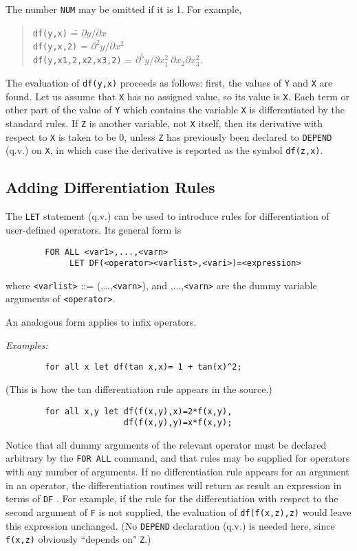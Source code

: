 The number {\tt NUM} may be omitted if it is 1.  For example,
\begin{quote}
\begin{tabbing}
{\tt            df(y,x)} \hspace{1in} \= = $\partial y/\partial x$ \\
{\tt            df(y,x,2)} \> = $\partial^{2}y/\partial x^{2}$ \\
{\tt            df(y,x1,2,x2,x3,2)} \> = $\partial^{5}y/\partial x_{1}^{2} \
 \partial x_{2}\partial x_{3}^{2}.$
\end{tabbing}
\end{quote}
The evaluation of {\tt df(y,x)} proceeds as follows: first, the values of
{\tt Y} and {\tt X} are found.  Let us assume that {\tt X} has no assigned
value, so its value is {\tt X}.  Each term or other part of the value of
{\tt Y} which contains the variable {\tt X} is differentiated by the
standard rules.  If {\tt Z} is another variable, not {\tt X} itself, then
its derivative with respect to {\tt X} is taken to be 0, unless {\tt Z}
has previously been declared to {\tt DEPEND} (q.v.) on {\tt X}, in which
case the derivative is reported as the symbol {\tt df(z,x)}.


\subsection{Adding Differentiation Rules}

The {\tt LET}  statement (q.v.) can be used to introduce
rules for differentiation of user-defined operators.  Its general form is
\begin{verbatim}
        FOR ALL <var1>,...,<varn>
             LET DF(<operator><varlist>,<vari>)=<expression>
\end{verbatim}
where {\tt <varlist>} ::= ({\tt <var1>},\dots,{\tt <varn>}), and
{\tt <var1>},...,{\tt <varn>} are the dummy variable arguments of
{\tt <operator>}.

An analogous form applies to infix operators.

{\it Examples:}
\begin{verbatim}
        for all x let df(tan x,x)= 1 + tan(x)^2;
\end{verbatim}
(This is how the tan differentiation rule appears in the {\REDUCE}
source.)
\begin{verbatim}
        for all x,y let df(f(x,y),x)=2*f(x,y),
                        df(f(x,y),y)=x*f(x,y);
\end{verbatim}
Notice that all dummy arguments of the relevant operator must be declared
arbitrary by the {\tt FOR ALL} command, and that rules may be supplied for
operators with any number of arguments.  If no differentiation rule
appears for an argument in an operator, the differentiation routines will
return as result an expression in terms of {\tt DF} \ttindex{DF}.  For
example, if the rule for the differentiation with respect to the second
argument of {\tt F} is not supplied, the evaluation of {\tt df(f(x,z),z)}
would leave this expression unchanged. (No {\tt DEPEND} declaration (q.v.)
is needed here, since {\tt f(x,z)} obviously ``depends on" {\tt Z}.)

